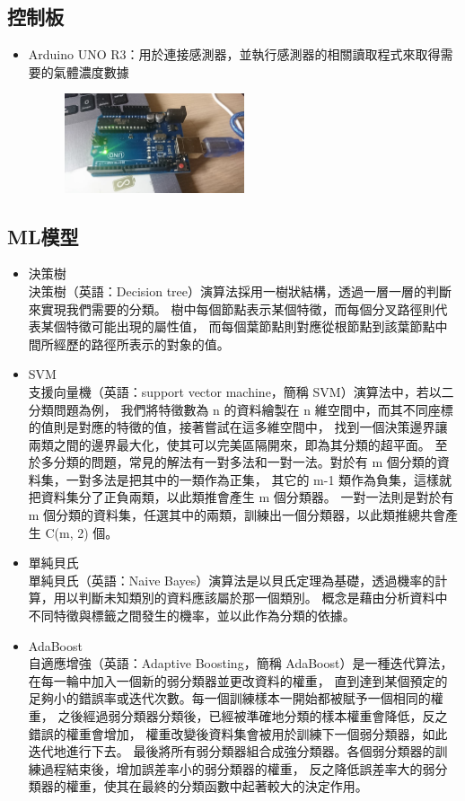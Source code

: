 	\subsection{控制板}
	\begin{itemize}
		\item Arduino UNO R3：用於連接感測器，並執行感測器的相關讀取程式來取得需要的氣體濃度數據
		\begin{figure}[H]
			\centering
			\includegraphics[width=0.5\textwidth]{../../pic/Uno.png}
		\end{figure}
	\end{itemize}
	\subsection{ML模型}
	\begin{itemize}
		\item 決策樹\\
			決策樹（英語：Decision tree）演算法採用一樹狀結構，透過一層一層的判斷來實現我們需要的分類。
			樹中每個節點表示某個特徵，而每個分叉路徑則代表某個特徵可能出現的屬性值，
			而每個葉節點則對應從根節點到該葉節點中間所經歷的路徑所表示的對象的值。
		\item SVM\\
			支援向量機（英語：support vector machine，簡稱 SVM）演算法中，若以二分類問題為例，
			我們將特徵數為 n 的資料繪製在 n 維空間中，而其不同座標的值則是對應的特徵的值，接著嘗試在這多維空間中，
			找到一個決策邊界讓兩類之間的邊界最大化，使其可以完美區隔開來，即為其分類的超平面。
			至於多分類的問題，常見的解法有一對多法和一對一法。對於有 m 個分類的資料集，一對多法是把其中的一類作為正集，
			其它的 m-1 類作為負集，這樣就把資料集分了正負兩類，以此類推會產生 m 個分類器。
			一對一法則是對於有 m 個分類的資料集，任選其中的兩類，訓練出一個分類器，以此類推總共會產生 C(m, 2) 個。
		\item 單純貝氏\\
			單純貝氏（英語：Naive Bayes）演算法是以貝氏定理為基礎，透過機率的計算，用以判斷未知類別的資料應該屬於那一個類別。
			概念是藉由分析資料中不同特徵與標籤之間發生的機率，並以此作為分類的依據。
		\item AdaBoost\\
			自適應增強（英語：Adaptive Boosting，簡稱 AdaBoost）是一種迭代算法，在每一輪中加入一個新的弱分類器並更改資料的權重，
			直到達到某個預定的足夠小的錯誤率或迭代次數。每一個訓練樣本一開始都被賦予一個相同的權重，
			之後經過弱分類器分類後，已經被準確地分類的樣本權重會降低，反之錯誤的權重會增加，
			權重改變後資料集會被用於訓練下一個弱分類器，如此迭代地進行下去。
			最後將所有弱分類器組合成強分類器。各個弱分類器的訓練過程結束後，增加誤差率小的弱分類器的權重，
			反之降低誤差率大的弱分類器的權重，使其在最終的分類函數中起著較大的決定作用。
	\end{itemize}